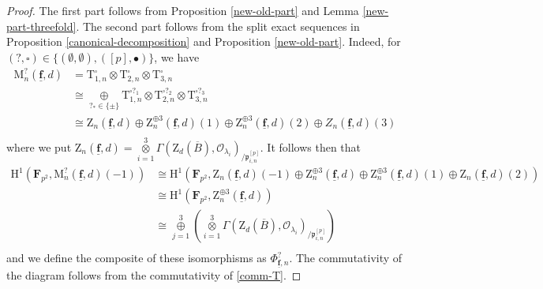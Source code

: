 \documentclass[10pt]{amsart}
\numberwithin{equation}{section}
\theoremstyle{plain}
\numberwithin{equation}{section}
\theoremstyle{definition}
\theoremstyle{remark}
\def\triplef{\underline{\mathbf{f}}}
\def\threetensor{\overset{3}{\underset{i=1}\otimes}}
\def\threesum{\overset{3}{\underset{j=1}\oplus} }
\def\calO{\mathcal{O}}
\def\frakp{\mathfrak{p}}
\def\FF{\mathbf{F}}
\def\rmH{\mathrm{H}}
\def\rmM{\mathrm{M}}
\def\rmT{\mathrm{T}}
\def\rmZ{\mathrm{Z}}
\begin{document}
\begin{proof}
The first part follows from Proposition \ref{new-old-part} and Lemma \ref{new-part-threefold}. The second part follows from the split exact sequences in Proposition \ref{canonical-decomposition} and Proposition \ref{new-old-part}. Indeed, for $(?,\square)\in\{(\emptyset, \emptyset), ([p], \bullet)\}$, we have
\begin{equation*}
\begin{aligned}
\rmM^{?}_{n}(\triplef, d)&= \rmT^{\square}_{1, n}\otimes\rmT^{\square}_{2, n}\otimes \rmT^{\square}_{3, n}\\
&\cong\underset{?_{\ast}\in\{\pm\}}\oplus\rmT^{\square?_{1}}_{1, n}\otimes \rmT^{\square?_{2}}_{2, n}\otimes\rmT^{\square?_{3}}_{3, n} \\
&\cong \rmZ_{n}(\triplef, d)\oplus  \rmZ^{\oplus 3}_{n}(\triplef, d)(1) \oplus  \rmZ^{\oplus 3}_{n}(\triplef, d)(2)\oplus  Z_{n}(\triplef, d)(3)\\
\end{aligned}
\end{equation*}
where we put $\rmZ_{n}(\triplef, d)=\threetensor\Gamma(\rmZ_{d}(\overline{B}),\calO_{\lambda_{i}})_{/\frakp^{[p]}_{i,n}}$. It follows then that
\begin{equation*}
\begin{aligned}
\rmH^{1}(\FF_{p^{2}}, \rmM^{?}_{n}(\triplef, d)(-1))&\cong\rmH^{1}(\FF_{p^{2}}, \rmZ_{n}(\triplef, d)(-1)\oplus \rmZ^{\oplus 3}_{n}(\triplef, d) \oplus \rmZ^{\oplus 3}_{n}(\triplef, d)(1)\oplus \rmZ_{n}(\triplef, d)(2))\\ 
&\cong\rmH^{1}(\FF_{p^{2}}, \rmZ^{\oplus 3}_{n}(\triplef, d))\\
&\cong\threesum(\threetensor\Gamma(\rmZ_{d}(\overline{B}),\calO_{\lambda_{i}})_{/\frakp^{[p]}_{i,n}})\\
\end{aligned}
\end{equation*}
and we define the composite of these isomorphisms as $\Phi^{?}_{\triplef, n}$. The commutativity of the diagram follows from the commutativity of \ref{comm-T}.
\end{proof}
\end{document}
